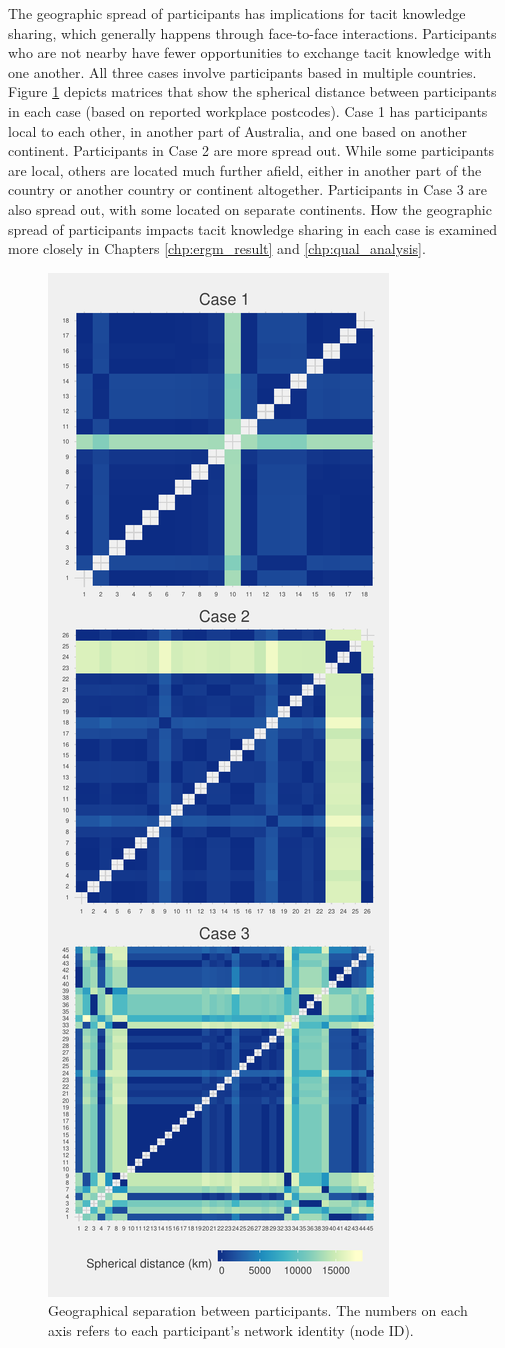 The geographic spread of participants has implications for tacit knowledge sharing, which generally happens through face-to-face interactions. Participants who are not nearby have fewer opportunities to exchange tacit knowledge with one another. All three cases involve participants based in multiple countries. Figure \ref{fig:spherical} depicts matrices that show the spherical distance between participants in each case (based on reported workplace postcodes). Case 1 has participants local to each other, in another part of Australia, and one based on another continent. Participants in Case 2 are more spread out. While some participants are local, others are located much further afield, either in another part of the country or another country or continent altogether. Participants in Case 3 are also spread out, with some located on separate continents. How the geographic spread of participants impacts tacit knowledge sharing in each case is examined more closely in Chapters \ref{chp:ergm_result} and \ref{chp:qual_analysis}.  \medskip

\begin{figure}[hbt!]
\centering
\includegraphics[width = 0.5\linewidth]{Images/proximity.pdf}
\caption[Geographical separation between participants]{Geographical separation between participants. The numbers on each axis refers to each participant's network identity (node ID).}
\label{fig:spherical}
\end{figure}

